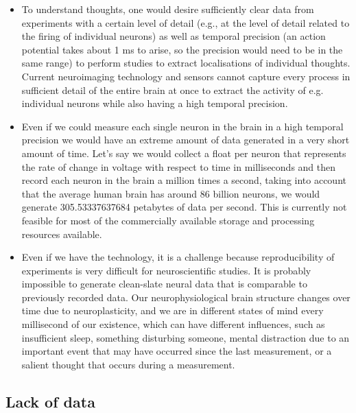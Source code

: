\begin{itemize}
  \item To understand thoughts, one would desire sufficiently clear data from experiments with a certain level of detail (e.g., at the level of detail related to the firing of individual neurons) as well as temporal precision (an action potential takes about 1 ms to arise, so the precision would need to be in the same range) to perform studies to extract localisations of individual thoughts. Current neuroimaging technology and sensors cannot capture every process in sufficient detail of the entire brain at once to extract the activity of e.g. individual neurons while also having a high temporal precision.
  \item Even if we could measure each single neuron in the brain in a high temporal precision we would have an extreme amount of data generated in a very short amount of time. Let's say we would collect a float per neuron that represents the rate of change in voltage with respect to time in milliseconds and then record each neuron in the brain a million times a second, taking into account that the average human brain has around 86 billion neurons, we would generate 305.53337637684 petabytes of data per second. This is currently not feasible for most of the commercially available storage and processing resources available.
  \item Even if we have the technology, it is a challenge because reproducibility of experiments is very difficult for neuroscientific studies. It is probably impossible to generate clean-slate neural data that is comparable to previously recorded data. Our neurophysiological brain structure changes over time due to neuroplasticity, and we are in different states of mind every millisecond of our existence, which can have different influences, such as insufficient sleep, something disturbing someone, mental distraction due to an important event that may have occurred since the last measurement, or a salient thought that occurs during a measurement.
\end{itemize}

\subsection{Lack of data}
\label{chapter2-lack-of-data}

